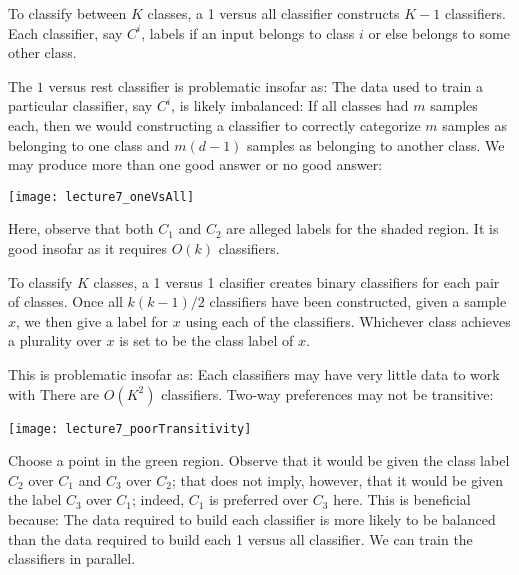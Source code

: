 \documentclass[../main.tex]{subfiles}
\begin{document}
\begin{definition}
    To classify between $K$ classes, a 1 versus all classifier constructs $K-1$ classifiers. Each classifier, say $C^{i}$, labels if an input belongs to class $i$ or else belongs to some other class.
\end{definition}

\begin{remark}
    \begin{outline}
        \1 The $1$ versus rest classifier is problematic insofar as:
        \2 The data used to train a particular classifier, say $C^{i}$, is likely imbalanced:
        \3 If all classes had $m$ samples each, then we would constructing a classifier to correctly categorize $m$ samples as belonging to one class and $m(d-1)$ samples as belonging to another class.
        \2 We may produce more than one good answer or no good answer:
        \3
            \begin{center}
                \texttt{[image: lecture7\_oneVsAll]}
            \end{center}
        \4 Here, observe that both $C_1$ and $C_2$ are alleged labels for the shaded region.
        \1 It is good insofar as it requires $O(k)$ classifiers.
    \end{outline}
\end{remark}

\begin{definition}
    To classify $K$ classes, a 1 versus 1 clasifier creates binary classifiers for each
    pair of classes. Once all $k(k-1)/2$ classifiers have been constructed, given a sample
    $x$, we then give a label for $x$ using each of the classifiers. Whichever class
    achieves a plurality over $x$ is set to be the class label of $x$.
\end{definition}

\begin{remark}
    \begin{outline}
        \1 This is problematic insofar as:
        \2 Each classifiers may have very little data to work with
        \2 There are $O(K^2)$ classifiers.
        \2 Two-way preferences may not be transitive:
        \3
            \begin{center}
                \texttt{[image: lecture7\_poorTransitivity]}
            \end{center}

        \4 Choose a point in the green region. Observe that it would be given the class
        label $C_2$ over $C_1$ and $C_3$ over $C_2$; that does not imply, however, that
        it would be given the label $C_3$ over $C_1$; indeed, $C_1$ is preferred over
        $C_3$ here.
        \1 This is beneficial because:
        \2 The data required to build each classifier is more likely to be balanced than
        the data required to build each 1 versus all classifier.
        \2 We can train the classifiers in parallel.
    \end{outline}
\end{remark}
\end{document}
